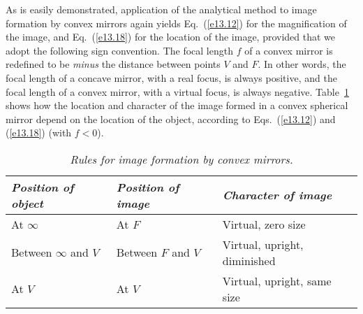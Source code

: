 As is easily demonstrated, 
application of the analytical method to image formation by convex mirrors again
yields Eq.~(\ref{e13.12}) for
the magnification of the image, and Eq.~(\ref{e13.18}) for the location of the
image, provided that we adopt the following sign convention.
The focal length $f$ of a convex mirror is redefined to be {\em
minus} the distance between points $V$ and $F$. In other words,
the focal length of a concave mirror, with a real focus, is always positive,
and the focal length of a convex mirror, with a virtual focus,
is always negative. Table~\ref{t13.2}
shows how the location  and character of the image formed
in a convex spherical mirror depend on the location of
the object, according to Eqs.~(\ref{e13.12}) and (\ref{e13.18}) (with $f<0$).
\begin{table}\centering
\begin{tabular}{lll}\hline
{\em Position of object} & {\em Position of image} &
{\em Character of image}\\ \hline
At $\infty$  & At $F$& Virtual, zero size\\
Between $\infty$ and $V$ & Between $F$ and $V$ &
Virtual, upright, diminished\\
At $V$ & At $V$ & Virtual, upright, same size\\
\end{tabular}
\caption{\em Rules for image formation by convex mirrors.}\label{t13.2}
\end{table}


